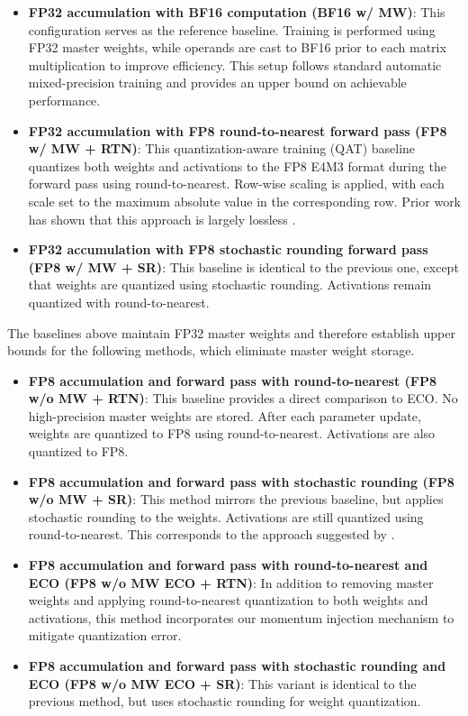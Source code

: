\documentclass[11pt, a4paper, onecolumn, copyright, goog]{google}
\newcommand{\methodname}{ECO}
\theoremstyle{plain}
\theoremstyle{definition}
\theoremstyle{remark}
\begin{document}
\begin{itemize}
    \item \textbf{FP32 accumulation with BF16 computation (BF16 w/ MW)}:
    This configuration serves as the reference baseline.
    Training is performed using FP32 master weights, while operands are cast to BF16 prior to each matrix multiplication to improve efficiency.
    This setup follows standard automatic mixed-precision training \citep{amp} and provides an upper bound on achievable performance.

    \item \textbf{FP32 accumulation with FP8 round-to-nearest forward pass (FP8 w/ MW + RTN)}:
    This quantization-aware training (QAT) baseline quantizes both weights and activations to the FP8 E4M3 format during the forward pass using round-to-nearest.
    Row-wise scaling is applied, with each scale set to the maximum absolute value in the corresponding row.
    Prior work has shown that this approach is largely lossless \citep{deepseekv3, fp8lm}.

    \item \textbf{FP32 accumulation with FP8 stochastic rounding forward pass (FP8 w/ MW + SR)}:
    This baseline is identical to the previous one, except that weights are quantized using stochastic rounding.
    Activations remain quantized with round-to-nearest.
\end{itemize}

The baselines above maintain FP32 master weights and therefore establish upper bounds for the following methods, which eliminate master weight storage.

\begin{itemize}
    \item \textbf{FP8 accumulation and forward pass with round-to-nearest (FP8 w/o MW + RTN)}:
    This baseline provides a direct comparison to \methodname{}.
    No high-precision master weights are stored.
    After each parameter update, weights are quantized to FP8 using round-to-nearest.
    Activations are also quantized to FP8.

    \item \textbf{FP8 accumulation and forward pass with stochastic rounding (FP8 w/o MW + SR)}:
    This method mirrors the previous baseline, but applies stochastic rounding to the weights.
    Activations are still quantized using round-to-nearest. This corresponds to the approach suggested by \citet{bf16sr}.

    \item \textbf{FP8 accumulation and forward pass with round-to-nearest and \methodname{} (FP8 w/o MW \methodname{} + RTN)}:
    In addition to removing master weights and applying round-to-nearest quantization to both weights and activations, this method incorporates our momentum injection mechanism to mitigate quantization error.

    \item \textbf{FP8 accumulation and forward pass with stochastic rounding and \methodname{} (FP8 w/o MW \methodname{} + SR)}:
    This variant is identical to the previous method, but uses stochastic rounding for weight quantization.
\end{itemize}
\end{document}
